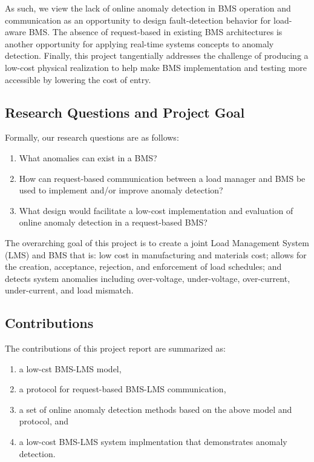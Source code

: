 \documentclass[11pt,conference,draftcls,onecolumn]{IEEEtran}
\begin{document}
As such, we view the lack of online anomaly detection in BMS operation and communication as an opportunity to design fault-detection behavior for load-aware BMS.
The absence of request-based in existing BMS architectures is another opportunity for applying real-time systems concepts to anomaly detection.
Finally, this project tangentially addresses the challenge of producing a low-cost physical realization to help make BMS implementation and testing more accessible by lowering the cost of entry.

\subsection{Research Questions and Project Goal}
Formally, our research questions are as follows:
\begin{enumerate}
    \item What anomalies can exist in a BMS?
    \item How can request-based communication between a load manager and BMS be used to implement and/or improve anomaly detection?
    \item What design would facilitate a low-cost implementation and evaluation of online anomaly detection in a request-based BMS?
\end{enumerate}

The overarching goal of this project is to create a joint Load Management System (LMS) and BMS that is: low cost in manufacturing and materials cost;
allows for the creation, acceptance, rejection, and enforcement of load schedules;
and detects system anomalies including over-voltage, under-voltage, over-current, under-current, and load mismatch.

\subsection{Contributions}
The contributions of this project report are summarized as:
\begin{enumerate}
    \item a low-cst BMS-LMS model,
    \item a protocol for request-based BMS-LMS communication,
    \item a set of online anomaly detection methods based on the above model and protocol, and
    \item a low-cost BMS-LMS system implmentation that demonstrates anomaly detection.
\end{enumerate}
\end{document}
